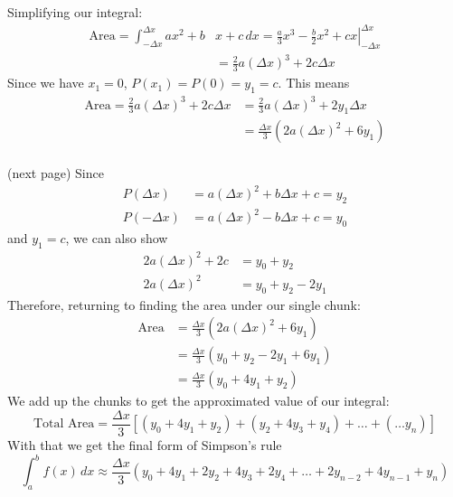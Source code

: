 \documentclass{report}
\begin{document}
Simplifying our integral:
\begin{align*}
\text{Area}=\int_{-\Delta x}^{\Delta x}ax^2+b&x+c\,dx
=\left.\frac{a}{3}x^3-\frac{b}{2}x^2+cx\right|^{\Delta x}_{-\Delta x}\\
&=\frac{2}{3}a(\Delta x)^3+2c\Delta x
\end{align*}
Since we have $x_1=0$, $P(x_1)=P(0)=y_1=c$. This means
\begin{align*}
\text{Area}=\frac{2}{3}a(\Delta x)^3+2c\Delta x
&=\frac{2}{3}a(\Delta x)^3+2y_1\Delta x\\
&=\frac{\Delta x}{3}(2a(\Delta x)^2+6y_1)
\end{align*}\\
(next page)
\newpage
\noindent Since
\begin{align*}
P(\Delta x)&=a(\Delta x)^2+b\Delta x+c=y_2\\
P(-\Delta x)&=a(\Delta x)^2-b\Delta x+c=y_0
\end{align*}
and $y_1=c$, we can also show
\begin{align*}
2a(\Delta x)^2+2c&=y_0+y_2\\
2a(\Delta x)^2&=y_0+y_2-2y_1
\end{align*}
Therefore, returning to finding the area under our single chunk:
\begin{align*}
\text{Area}&=\frac{\Delta x}{3}(2a(\Delta x)^2+6y_1)\\
&=\frac{\Delta x}{3}(y_0+y_2-2y_1+6y_1)\\
&=\frac{\Delta x}{3}(y_0+4y_1+y_2)
\end{align*}
We add up the chunks to get the approximated value of our integral:
\begin{equation*}
\text{Total Area}=\frac{\Delta x}{3}
[(y_0+4y_1+y_2)+(y_2+4y_3+y_4)+\ldots+(\ldots y_n)]
\end{equation*}
With that we get the final form of Simpson's rule
\begin{equation*}
\int_a^bf(x)\,dx\approx \frac{\Delta x}{3}(y_0+4y_1+2y_2
+4y_3+2y_4+\ldots+2y_{n-2}+4y_{n-1}+y_n) 
\end{equation*} 
\newpage 
\end{document}
